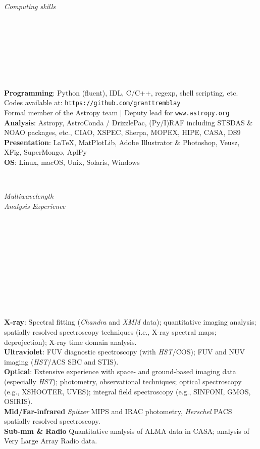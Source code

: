 \documentclass[11pt]{article}
\begin{document}
\hspace{2.5mm} \parbox{1.5in}{{\it Computing skills \\\\\\\\\\\\\\\\}} 
\parbox{5.15in}{
{\bf Programming}: Python (fluent), IDL, C/C++, regexp, shell scripting, etc. \\ Codes available at: {\small \texttt{https://github.com/granttremblay}}\\
Formal member of the Astropy team $|$ Deputy lead for \texttt{www.astropy.org} \\
{\bf Analysis}: Astropy, AstroConda / DrizzlePac, (Py/I)RAF including STSDAS \& NOAO packages, etc., CIAO, XSPEC, Sherpa, MOPEX, HIPE, CASA, DS9 \\
{\bf Presentation}:  \LaTeX, MatPlotLib, Adobe Illustrator \& Photoshop, Veusz, XFig, SuperMongo, AplPy \\
{\bf OS}: Linux, macOS, Unix, Solaris, Windows\\
}\\

\hspace{2.5mm} \parbox{1.5in}{{\it Multiwavelength \\ Analysis Experience \\\\\\\\\\\\\\\\\\\\\\}} \parbox{5.15in}{
{\bf X-ray}: Spectral fitting ({\it Chandra} and {\it XMM} data); quantitative imaging analysis; spatially resolved spectroscopy techniques (i.e., X-ray spectral maps; deprojection); X-ray time domain analysis. \\
{\bf Ultraviolet}: FUV diagnostic spectroscopy (with {\it HST}/COS); FUV and NUV imaging ({\it HST}/ACS SBC and STIS). \\
{\bf Optical}: Extensive experience with space- and ground-based imaging data (especially {\it HST}); photometry, observational techniques; optical spectroscopy (e.g., XSHOOTER, UVES);  integral field spectroscopy (e.g., SINFONI, GMOS, OSIRIS). \\
{\bf Mid/Far-infrared} {\it Spitzer} MIPS and IRAC photometry, {\it Herschel} PACS spatially resolved spectroscopy.  \\
{\bf Sub-mm \& Radio} Quantitative analysis of ALMA data in CASA; analysis of Very Large Array Radio data.  \\
}\\
\end{document}
